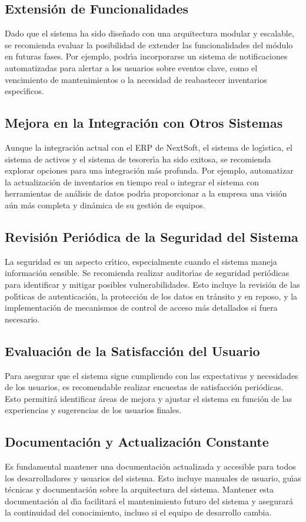 \documentclass[stu, 12pt, letterpaper, donotrepeattitle, floatsintext, natbib]{apa7}
\begin{document}
\subsection{Extensi\'on de Funcionalidades}
Dado que el sistema ha sido dise\~{n}ado con una arquitectura modular y escalable, se recomienda evaluar la posibilidad de extender las funcionalidades del m\'odulo en futuras fases. Por ejemplo, podr\'{\i}a incorporarse un sistema de notificaciones automatizadas para alertar a los usuarios sobre eventos clave, como el vencimiento de mantenimientos o la necesidad de reabastecer inventarios espec\'{\i}ficos.
\subsection{Mejora en la Integraci\'on con Otros Sistemas}
Aunque la integraci\'on actual con el ERP de NextSoft, el sistema de log\'{\i}stica, el sistema de activos y el sistema de tesorer\'{\i}a ha sido exitosa, se recomienda explorar opciones para una integraci\'on m\'as profunda. Por ejemplo, automatizar la actualizaci\'on de inventarios en tiempo real o integrar el sistema con herramientas de an\'alisis de datos podr\'{\i}a proporcionar a la empresa una visi\'on a\'un m\'as completa y din\'amica de su gesti\'on de equipos.
\subsection{Revisi\'on Peri\'odica de la Seguridad del Sistema}
La seguridad es un aspecto cr\'{\i}tico, especialmente cuando el sistema maneja informaci\'on sensible. Se recomienda realizar auditor\'{\i}as de seguridad peri\'odicas para identificar y mitigar posibles vulnerabilidades. Esto incluye la revisi\'on de las pol\'{\i}ticas de autenticaci\'on, la protecci\'on de los datos en tr\'ansito y en reposo, y la implementaci\'on de mecanismos de control de acceso m\'as detallados si fuera necesario.
\subsection{Evaluaci\'on de la Satisfacci\'on del Usuario}
Para asegurar que el sistema sigue cumpliendo con las expectativas y necesidades de los usuarios, es recomendable realizar encuestas de satisfacci\'on peri\'odicas. Esto permitir\'a identificar \'areas de mejora y ajustar el sistema en funci\'on de las experiencias y sugerencias de los usuarios finales.
\subsection{Documentaci\'on y Actualizaci\'on Constante}
Es fundamental mantener una documentaci\'on actualizada y accesible para todos los desarrolladores y usuarios del sistema. Esto incluye manuales de usuario, gu\'{\i}as t\'ecnicas y documentaci\'on sobre la arquitectura del sistema. Mantener esta documentaci\'on al d\'{\i}a facilitar\'a el mantenimiento futuro del sistema y asegurar\'a la continuidad del conocimiento, incluso si el equipo de desarrollo cambia.
\end{document}
